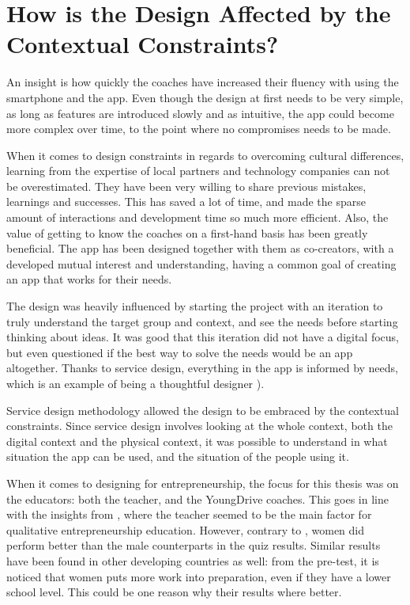 
\section{How is the Design Affected by the Contextual Constraints?} %

  An insight is how quickly the coaches have increased their fluency with using the smartphone and the app. Even though the design at first needs to be very simple, as long as features are introduced slowly and as intuitive, the app could become more complex over time, to the point where no compromises needs to be made.

  When it comes to design constraints in regards to overcoming cultural differences, learning from the expertise of local partners and technology companies can not be overestimated. They have been very willing to share previous mistakes, learnings and successes. This has saved a lot of time, and made the sparse amount of interactions and development time so much more efficient. Also, the value of getting to know the coaches on a first-hand basis has been greatly beneficial. The app has been designed together with them as co-creators, with a developed mutual interest and understanding, having a common goal of creating an app that works for their needs.

  The design was heavily influenced by starting the project with an iteration to truly understand the target group and context, and see the needs before starting thinking about ideas. It was good that this iteration did not have a digital focus, but even questioned if the best way to solve the needs would be an app altogether. Thanks to service design, everything in the app is informed by needs, which is an example of being a thoughtful designer \citep{lowgren} \citep{stickdorn}).

  Service design methodology allowed the design to be embraced by the contextual constraints. Since service design involves looking at the whole context, both the digital context and the physical context, it was possible to understand in what situation the app can be used, and the situation of the people using it.

  When it comes to designing for entrepreneurship, the focus for this thesis was on the educators: both the teacher, and the YoungDrive coaches. This goes in line with the insights from \cite{ruskovaara}, where the teacher seemed to be the main factor for qualitative entrepreneurship education. However, contrary to \cite{ruskovaara}, women did perform better than the male counterparts in the quiz results. Similar results have been found in other developing countries as well: from the pre-test, it is noticed that women puts more work into preparation, even if they have a lower school level. This could be one reason why their results where better.

